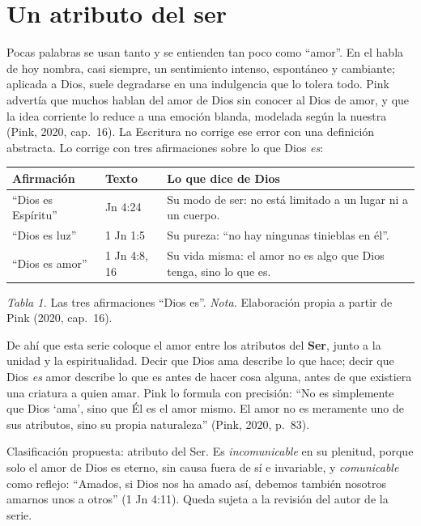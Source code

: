 \documentclass[11pt,letterpaper]{article}
\newcommand{\destacar}[1]{\textbf{\textcolor{azul}{#1}}}
\begin{document}
\section{Un atributo del ser}

Pocas palabras se usan tanto y se entienden tan poco como ``amor''. En el habla de hoy nombra, casi siempre, un sentimiento intenso, espontáneo y cambiante; aplicada a Dios, suele degradarse en una indulgencia que lo tolera todo. Pink advertía que muchos hablan del amor de Dios sin conocer al Dios de amor, y que la idea corriente lo reduce a una emoción blanda, modelada según la nuestra (Pink, 2020, cap.~16). La Escritura no corrige ese error con una definición abstracta. Lo corrige con tres afirmaciones sobre lo que Dios \emph{es}:

\begin{center}\small\renewcommand{\arraystretch}{1.2}
\begin{tabular}{@{}L{3.6cm}L{3.0cm}L{8.2cm}@{}}
\toprule
\textbf{Afirmación} & \textbf{Texto} & \textbf{Lo que dice de Dios} \\ \midrule
``Dios es Espíritu'' & Jn 4:24 & Su modo de ser: no está limitado a un lugar ni a un cuerpo. \\
``Dios es luz'' & 1 Jn 1:5 & Su pureza: ``no hay ningunas tinieblas en él''. \\
``Dios es amor'' & 1 Jn 4:8, 16 & Su vida misma: el amor no es algo que Dios tenga, sino lo que es. \\
\bottomrule
\end{tabular}\par
{\footnotesize\color{gris}\textit{Tabla 1.} Las tres afirmaciones ``Dios es''. \textit{Nota.} Elaboración propia a partir de Pink (2020, cap.~16).}
\end{center}

De ahí que esta serie coloque el amor entre los atributos del \destacar{Ser}, junto a la unidad y la espiritualidad. Decir que Dios ama describe lo que hace; decir que Dios \emph{es} amor describe lo que es antes de hacer cosa alguna, antes de que existiera una criatura a quien amar. Pink lo formula con precisión: ``No es simplemente que Dios `ama', sino que Él es el amor mismo. El amor no es meramente uno de sus atributos, sino su propia naturaleza'' (Pink, 2020, p.~83).

\begin{nota}[Precisión]
Clasificación propuesta: atributo del Ser. Es \emph{incomunicable} en su plenitud, porque solo el amor de Dios es eterno, sin causa fuera de sí e invariable, y \emph{comunicable} como reflejo: ``Amados, si Dios nos ha amado así, debemos también nosotros amarnos unos a otros'' (1 Jn 4:11). Queda sujeta a la revisión del autor de la serie.
\end{nota}
\end{document}
